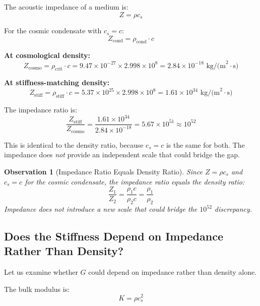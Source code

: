 \documentclass[11pt,a4paper]{article}
\newcommand{\ee}[1]{\times 10^{#1}}
\newcommand{\rhocrit}{\ensuremath{\rho_{\mathrm{crit}}}}
\newcommand{\rhostiff}{\ensuremath{\rho_{\mathrm{stiff}}}}
\newtheorem{observation}{Observation}
\theoremstyle{definition}
\begin{document}
The acoustic impedance of a medium is:
\begin{equation}
Z = \rho c_s
\end{equation}

For the cosmic condensate with $c_s = c$:
\begin{equation}
Z_{\mathrm{cond}} = \rho_{\mathrm{cond}} \cdot c
\end{equation}

\textbf{At cosmological density:}
\begin{equation}
Z_{\mathrm{cosmo}} = \rhocrit \cdot c = 9.47 \ee{-27} \times 2.998 \ee{8} = 2.84 \ee{-18} \text{ kg/(m}^2\cdot\text{s)}
\end{equation}

\textbf{At stiffness-matching density:}
\begin{equation}
Z_{\mathrm{stiff}} = \rhostiff \cdot c = 5.37 \ee{25} \times 2.998 \ee{8} = 1.61 \ee{34} \text{ kg/(m}^2\cdot\text{s)}
\end{equation}

The impedance ratio is:
\begin{equation}
\frac{Z_{\mathrm{stiff}}}{Z_{\mathrm{cosmo}}} = \frac{1.61 \ee{34}}{2.84 \ee{-18}} = 5.67 \ee{51} \approx 10^{52}
\end{equation}

This is identical to the density ratio, because $c_s = c$ is the same for both. The impedance does \emph{not} provide an independent scale that could bridge the gap.

\begin{observation}[Impedance Ratio Equals Density Ratio]
\label{obs:impedance_density}
Since $Z = \rho c_s$ and $c_s = c$ for the cosmic condensate, the impedance ratio equals the density ratio:
\begin{equation}
\frac{Z_1}{Z_2} = \frac{\rho_1 c}{\rho_2 c} = \frac{\rho_1}{\rho_2}
\end{equation}
Impedance does not introduce a new scale that could bridge the $10^{52}$ discrepancy.
\end{observation}

\subsection{Does the Stiffness Depend on Impedance Rather Than Density?}
\label{sec:stiffness_impedance}

Let us examine whether $G$ could depend on impedance rather than density alone.

The bulk modulus is:
\begin{equation}
K = \rho c_s^2
\end{equation}
\end{document}
